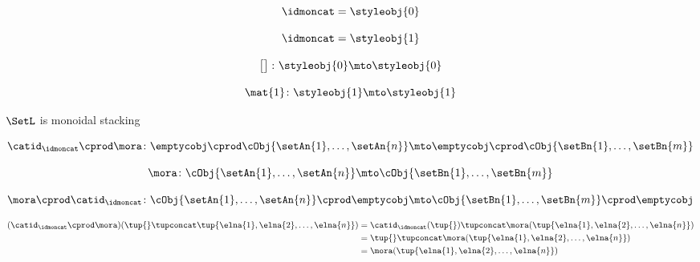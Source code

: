 \begin{forslides}
    \begin{equation}
        \label{eq:parallelism-062}
        \idmoncat =  \styleobj{0} 
    \end{equation}

    \begin{equation}
        \label{eq:parallelism-063}
        \idmoncat =  \styleobj{1} 
    \end{equation}

    \begin{equation}
        \label{eq:parallelism-064}
        \begin{bmatrix}\\ \end{bmatrix} \colon \styleobj{0} \mto \styleobj{0} 
    \end{equation}

    \begin{equation}
        \label{eq:parallelism-065}
        \mat{ 1 } \colon \styleobj{1} \mto \styleobj{1}
    \end{equation}


$\SetL$ is monoidal stacking

    \begin{equation}
        \label{eq:parallelism-066}
        \catid_\idmoncat \cprod \mora \colon \emptycobj \cprod \cObj{\setAn{1}, \ldots, \setAn{n}} \mto \emptycobj \cprod \cObj{\setBn{1}, \ldots, \setBn{m}}
    \end{equation}

    \begin{equation}
        \label{eq:parallelism-067}
       \mora \colon  \cObj{\setAn{1}, \ldots, \setAn{n}} \mto  \cObj{\setBn{1}, \ldots, \setBn{m}}
    \end{equation}

    \begin{equation}
        \label{eq:parallelism-068}
         \mora \cprod  \catid_\idmoncat  \colon \cObj{\setAn{1}, \ldots, \setAn{n}} \cprod \emptycobj \mto  \cObj{\setBn{1}, \ldots, \setBn{m}}  \cprod \emptycobj
    \end{equation}

    \begin{align*}
        \label{eq:parallelism-069}
        (\catid_\idmoncat \cprod \mora) (\tup{} \tupconcat  \tup{\elna{1}, \elna{2}, \ldots, \elna{n}}) &= \catid_\idmoncat (\tup{}) \tupconcat \mora(\tup{\elna{1}, \elna{2}, \ldots, \elna{n}}) \\ &= \tup{} \tupconcat \mora(\tup{\elna{1}, \elna{2}, \ldots, \elna{n}}) \\
        &=  \mora(\tup{\elna{1}, \elna{2}, \ldots, \elna{n}})
    \end{align*}


\end{forslides}
